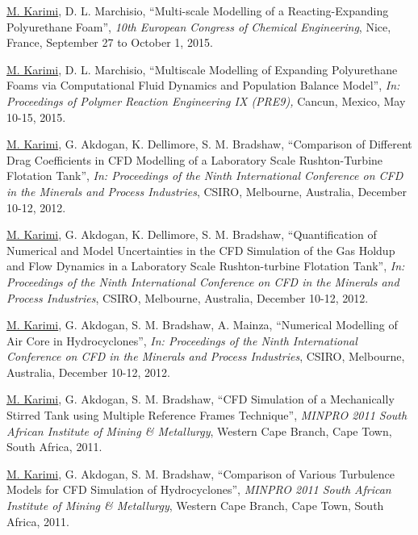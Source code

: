 \documentclass[10pt,a4]{article}
\newcounter{myEnumCounter}
\newcounter{mySaveCounter}
\renewenvironment{enumerate}{%
  \begin{list}{\arabic{myEnumCounter}.}{\usecounter{myEnumCounter}%
  \setcounter{myEnumCounter}{\value{mySaveCounter}}}
  }{%
  \setcounter{mySaveCounter}{\value{myEnumCounter}}\end{list}%
}
\newcommand{\quotes}[1]{``#1''}
\begin{document}
\begin{small}
\begin{enumerate}
	\item 
\underline{M. Karimi}, D. L. Marchisio, \quotes{Multi-scale Modelling of a Reacting-Expanding Polyurethane Foam}, \textit{10th European Congress of Chemical Engineering}, Nice, France, September 27 to October 1, 2015.	

	\item
\underline{M. Karimi}, D. L. Marchisio, \quotes{Multiscale Modelling of Expanding Polyurethane Foams via Computational Fluid Dynamics and Population Balance Model}, \textit{In: Proceedings of Polymer Reaction Engineering IX (PRE9),} Cancun, Mexico, May 10-15, 2015.


	\item
\underline{M. Karimi}, G. Akdogan, K. Dellimore, S. M. Bradshaw, \quotes{Comparison of Different Drag Coefficients in CFD Modelling of a Laboratory Scale Rushton-Turbine Flotation Tank}, \textit{In: Proceedings of the Ninth International Conference on CFD in the Minerals and Process Industries}, CSIRO, Melbourne, Australia, December 10-12, 2012.
	\item
\underline{M. Karimi}, G. Akdogan, K. Dellimore, S. M. Bradshaw, \quotes{Quantification of Numerical and Model Uncertainties in the CFD Simulation of the Gas Holdup and Flow Dynamics in a Laboratory Scale Rushton-turbine Flotation Tank}, \textit{In: Proceedings of the Ninth International Conference on CFD in the Minerals and Process Industries}, CSIRO, Melbourne, Australia, December 10-12, 2012.
	\item 
\underline{M. Karimi}, G. Akdogan, S. M. Bradshaw, A. Mainza,  \quotes{Numerical Modelling of Air Core in Hydrocyclones}, \textit{In: Proceedings of the Ninth International Conference on CFD in the Minerals and Process Industries}, CSIRO, Melbourne, Australia, December 10-12, 2012.
	\item 
\underline{M. Karimi}, G. Akdogan, S. M. Bradshaw, \quotes{CFD Simulation of a Mechanically Stirred Tank using Multiple Reference Frames Technique}, \textit{MINPRO 2011 South African Institute of Mining \& Metallurgy}, Western Cape Branch, Cape Town, South Africa, 2011.
	\item 
\underline{M. Karimi}, G. Akdogan, S. M. Bradshaw, \quotes{Comparison of Various Turbulence Models for CFD Simulation of Hydrocyclones}, \textit{MINPRO 2011 South African Institute of Mining \& Metallurgy}, Western Cape Branch, Cape Town, South Africa, 2011.


\end{enumerate}
\end{small}
\end{document}
